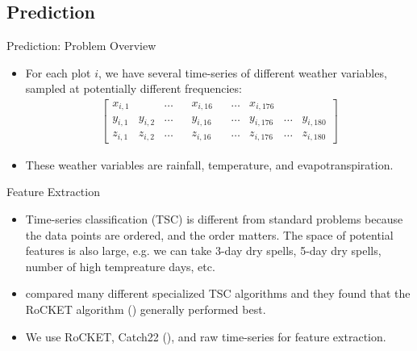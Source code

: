 \documentclass{beamer}
\begin{document}
\subsection{Prediction}
\begin{frame}{Prediction: Problem Overview}
    \begin{itemize}
        \setlength\itemsep{2em} 
        \item For each plot $i$, we have several time-series of different weather variables, sampled at potentially different frequencies:
        \begin{align*}
            \begin{bmatrix}
             x_{i,1} &         & \ldots &     & x_{i,16} &     & \ldots & x_{i,176} &        &  \\
             y_{i,1} & y_{i,2} & \ldots &     & y_{i,16} &     & \ldots & y_{i,176} & \ldots & y_{i,180} \\
             z_{i,1} & z_{i,2} & \ldots &     & z_{i,16} &     & \ldots & z_{i,176} & \ldots & z_{i,180}
                \end{bmatrix}
        \end{align*}
        \item These weather variables are rainfall, temperature, and evapotranspiration. 
    \end{itemize}
\end{frame}

\begin{frame}{Feature Extraction}
    \begin{itemize}
        \setlength\itemsep{2em} 
        \item Time-series classification (TSC) is different from standard problems because the data points are ordered, and the order matters. The space of potential features is also large, e.g. we can take 3-day dry spells, 5-day dry spells, number of high tempreature days, etc. 
        \item \cite{ruiz2021great} compared many different specialized TSC algorithms and they found that the RoCKET algorithm (\cite{dempster2020rocket}) generally performed best. 
        \item We use RoCKET, Catch22 (\cite{lubba2019catch22}), and raw time-series for feature extraction. 
    \end{itemize}
    
\end{frame}
\end{document}
